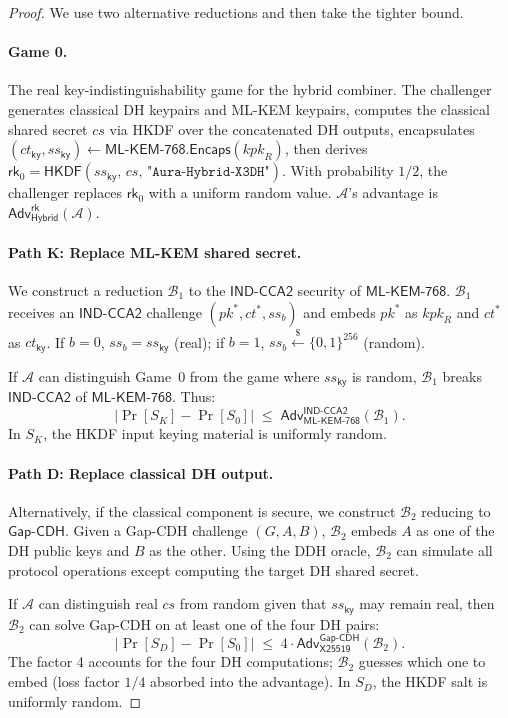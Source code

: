 \documentclass[11pt,a4paper]{article}
\theoremstyle{definition}
\theoremstyle{remark}
\newcommand{\adv}{\mathsf{Adv}}
\newcommand{\advA}{\mathcal{A}}
\newcommand{\advB}{\mathcal{B}}
\newcommand{\HKDF}{\mathsf{HKDF}}
\renewcommand{\DH}{\mathsf{X25519}}
\newcommand{\KEM}{\mathsf{ML\text{-}KEM\text{-}768}}
\newcommand{\Encaps}{\mathsf{Encaps}}
\newcommand{\GapCDH}{\mathsf{Gap\text{-}CDH}}
\newcommand{\INDCCA}{\mathsf{IND\text{-}CCA2}}
\newcommand{\rk}{\mathsf{rk}}
\newcommand{\getsr}{\xleftarrow{\$}}
\newcommand{\bits}{\{0,1\}}
\begin{document}
\begin{proof}
We use two alternative reductions and then take the tighter bound.

\paragraph{Game 0.}
The real key-indistinguishability game for the hybrid combiner.  The challenger generates
classical DH keypairs and ML-KEM keypairs, computes the classical shared secret
$\mathit{cs}$ via HKDF over the concatenated DH outputs, encapsulates
$(\mathit{ct}_{\mathsf{ky}}, \mathit{ss}_{\mathsf{ky}}) \gets
\KEM.\Encaps(\mathit{kpk}_R)$, then derives
$\rk_0 = \HKDF(\mathit{ss}_{\mathsf{ky}},\, \mathit{cs},\,
\texttt{"Aura-Hybrid-X3DH"})$.  With probability $1/2$, the challenger
replaces $\rk_0$ with a uniform random value.  $\advA$'s advantage is
$\adv^{\mathsf{rk}}_{\mathsf{Hybrid}}(\advA)$.

\paragraph{Path K: Replace ML-KEM shared secret.}
We construct a reduction $\advB_1$ to the $\INDCCA$ security of $\KEM$.
$\advB_1$ receives an $\INDCCA$ challenge $(\mathit{pk}^*, \mathit{ct}^*,
\mathit{ss}_b)$ and embeds $\mathit{pk}^*$ as $\mathit{kpk}_R$ and
$\mathit{ct}^*$ as $\mathit{ct}_{\mathsf{ky}}$.  If $b = 0$,
$\mathit{ss}_b = \mathit{ss}_{\mathsf{ky}}$ (real); if $b = 1$,
$\mathit{ss}_b \getsr \bits^{256}$ (random).

If $\advA$ can distinguish Game~0 from the game where $\mathit{ss}_{\mathsf{ky}}$
is random, $\advB_1$ breaks $\INDCCA$ of $\KEM$.  Thus:
\[
  |\Pr[S_K] - \Pr[S_0]| \;\leq\; \adv^{\INDCCA}_{\KEM}(\advB_1).
\]
In $S_K$, the HKDF input keying material is uniformly random.

\paragraph{Path D: Replace classical DH output.}
Alternatively, if the classical component is secure, we construct
$\advB_2$ reducing to $\GapCDH$.  Given a Gap-CDH challenge $(G, A, B)$,
$\advB_2$ embeds $A$ as one of the DH public keys and $B$ as the other.
Using the DDH oracle, $\advB_2$ can simulate all protocol operations except
computing the target DH shared secret.

If $\advA$ can distinguish real $\mathit{cs}$ from random given that
$\mathit{ss}_{\mathsf{ky}}$ may remain real, then $\advB_2$ can solve
Gap-CDH on at least one of the four DH pairs:
\[
  |\Pr[S_D] - \Pr[S_0]| \;\leq\; 4 \cdot \adv^{\GapCDH}_{\DH}(\advB_2).
\]
The factor 4 accounts for the four DH computations; $\advB_2$ guesses which
one to embed (loss factor $1/4$ absorbed into the advantage).
In $S_D$, the HKDF salt is uniformly random.


\end{proof}
\end{document}
